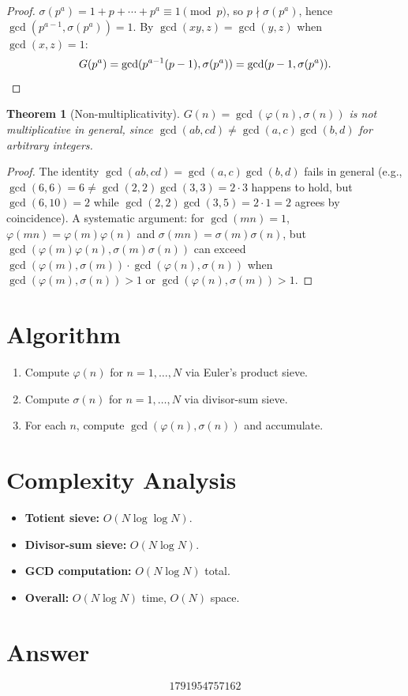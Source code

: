 \documentclass[12pt]{article}
\newtheorem{theorem}{Theorem}
\begin{document}
\begin{proof}
$\sigma(p^a) = 1+p+\cdots+p^a \equiv 1\pmod{p}$, so $p\nmid\sigma(p^a)$, hence $\gcd(p^{a-1},\sigma(p^a))=1$. By $\gcd(xy,z)=\gcd(y,z)$ when $\gcd(x,z)=1$:
\[
G(p^a) = \gcd(p^{a-1}(p-1),\sigma(p^a)) = \gcd(p-1,\sigma(p^a)). \qedhere
\]
\end{proof}

\begin{theorem}[Non-multiplicativity]
$G(n)=\gcd(\varphi(n),\sigma(n))$ is not multiplicative in general, since $\gcd(ab,cd)\ne\gcd(a,c)\gcd(b,d)$ for arbitrary integers.
\end{theorem}

\begin{proof}
The identity $\gcd(ab,cd)=\gcd(a,c)\gcd(b,d)$ fails in general (e.g., $\gcd(6,6)=6\ne\gcd(2,2)\gcd(3,3)=2\cdot 3$ happens to hold, but $\gcd(6,10)=2$ while $\gcd(2,2)\gcd(3,5)=2\cdot 1=2$ agrees by coincidence). A systematic argument: for $\gcd(mn)=1$, $\varphi(mn)=\varphi(m)\varphi(n)$ and $\sigma(mn)=\sigma(m)\sigma(n)$, but $\gcd(\varphi(m)\varphi(n),\sigma(m)\sigma(n))$ can exceed $\gcd(\varphi(m),\sigma(m))\cdot\gcd(\varphi(n),\sigma(n))$ when $\gcd(\varphi(m),\sigma(n))>1$ or $\gcd(\varphi(n),\sigma(m))>1$.
\end{proof}

\section{Algorithm}
\begin{enumerate}
\item Compute $\varphi(n)$ for $n=1,\ldots,N$ via Euler's product sieve.
\item Compute $\sigma(n)$ for $n=1,\ldots,N$ via divisor-sum sieve.
\item For each $n$, compute $\gcd(\varphi(n),\sigma(n))$ and accumulate.
\end{enumerate}

\section{Complexity Analysis}
\begin{itemize}
\item \textbf{Totient sieve:} $O(N\log\log N)$.
\item \textbf{Divisor-sum sieve:} $O(N\log N)$.
\item \textbf{GCD computation:} $O(N\log N)$ total.
\item \textbf{Overall:} $O(N\log N)$ time, $O(N)$ space.
\end{itemize}

\section{Answer}

\[
\boxed{1791954757162}
\]
\end{document}
